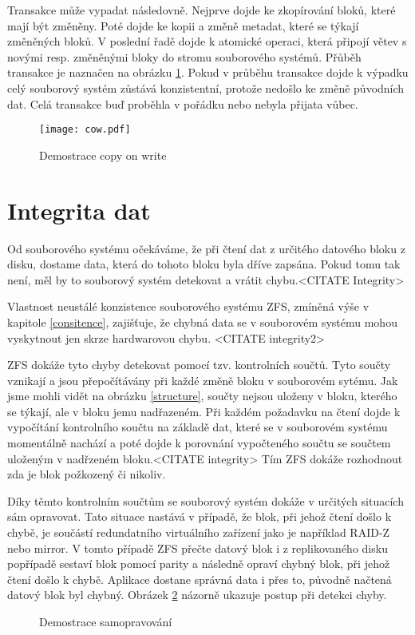Transakce může vypadat následovně. Nejprve dojde ke zkopírování bloků, které mají být změněny. Poté dojde ke kopii a změně metadat, které se týkají změněných bloků. V poslední
řadě dojde k atomické operaci, která připojí větev s novými resp. změněnými bloky do stromu souborového systémů. Přůběh transakce je naznačen na obrázku \ref{cow}. Pokud v průběhu transakce dojde k výpadku celý souborový systém zůstává konzistentní, protože nedošlo ke změně původních dat. Celá transakce buď proběhla v pořádku nebo nebyla přijata vůbec.
\begin{figure}[h]
    \caption{Demostrace copy on write}
    \label{cow}
    \texttt{[image: cow.pdf]}
\end{figure}
\section{Integrita dat}
\label{checksum}
Od souborového systému očekáváme, že při čtení dat z určitého datového bloku z disku, dostame data, která do tohoto bloku byla dříve zapsána. Pokud tomu tak není, měl by to souborový systém detekovat a vrátit chybu.<CITATE Integrity>

Vlastnost neustálé konzistence souborového systému ZFS, zmíněná výše v kapitole \ref{consitence}, zajišťuje, že chybná data se v souborovém systému mohou vyskytnout jen skrze hardwarovou chybu. <CITATE integrity2>

ZFS dokáže tyto chyby detekovat pomocí tzv. kontrolních součtů. Tyto součty vznikají a jsou přepočítávány při každé změně bloku v souborovém sytému. Jak jsme mohli vidět na obrázku \ref{structure}, součty nejsou uloženy v bloku, kterého se týkají, ale v bloku jemu nadřazeném. Při každém požadavku na čtení dojde k vypočítání kontrolního součtu na základě dat, které se v souborovém systému momentálně nachází a poté dojde k porovnání vypočteného součtu se součtem uloženým v nadřzeném bloku.<CITATE integrity> Tím ZFS dokáže rozhodnout zda je blok požkozený či nikoliv.

Díky těmto kontrolním součtům se souborový systém dokáže v určitých situacích sám opravovat. Tato situace nastává v případě, že blok, při jehož čtení došlo k chybě, je součástí redundatního virtuálního zařízení jako je například RAID-Z nebo mirror. V tomto případě ZFS přečte datový blok i z replikovaného disku popřípadě sestaví blok pomocí parity a následně opraví chybný blok, při jehož čtení došlo k chybě. Aplikace dostane správná data i přes to, původně načtená datový blok byl chybný. Obrázek \ref{selfhealing} názorně ukazuje postup při detekci chyby.
\begin{figure}[h]
    \caption{Demostrace samopravování}
    \label{selfhealing}
\end{figure}

